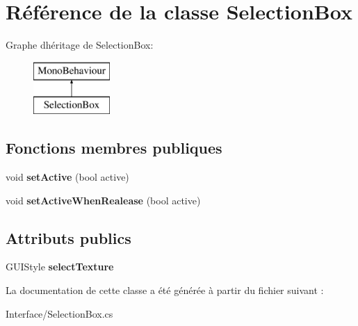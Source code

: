 \hypertarget{class_selection_box}{}\section{Référence de la classe Selection\+Box}
\label{class_selection_box}
Graphe d\textquotesingle{}héritage de Selection\+Box\+:\begin{figure}[H]
\begin{center}
\leavevmode
\includegraphics[height=2.000000cm]{class_selection_box}
\end{center}
\end{figure}
\subsection*{Fonctions membres publiques}
\begin{DoxyCompactItemize}
\item 
\mbox{\label{class_selection_box_a008531028a56f9b784d05ff1fef02991}} 
void {\bfseries set\+Active} (bool active)
\item 
\mbox{\label{class_selection_box_a03257767fe70c02ebb259ec80ccfd9f6}} 
void {\bfseries set\+Active\+When\+Realease} (bool active)
\end{DoxyCompactItemize}
\subsection*{Attributs publics}
\begin{DoxyCompactItemize}
\item 
\mbox{\label{class_selection_box_a2ce1b3bb8021803cc1229439c8cd7a0c}} 
G\+U\+I\+Style {\bfseries select\+Texture}
\end{DoxyCompactItemize}


La documentation de cette classe a été générée à partir du fichier suivant \+:\begin{DoxyCompactItemize}
\item 
Interface/Selection\+Box.\+cs\end{DoxyCompactItemize}
